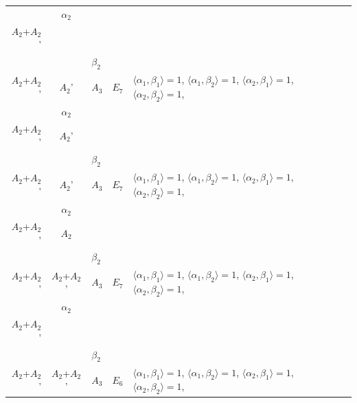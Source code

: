 \documentclass[12pt]{report}
\begin{document}
\begin{appendix}
{\begin{longtable}{rcl p{1cm}p{1cm}p{3cm} }
\\
\begin{tabular}{cc}$\alpha_1$+ & $\alpha_2$\\\tiny{ $A_2$+$A_2$' } & \tiny{  }\end{tabular} &\begin{tabular}{c} = \\~ \end{tabular} & \begin{tabular}{cc}$\beta_1$+ & $\beta_2$\\\tiny{ $A_2$+$A_2$' } & \tiny{ $A_2$' }\end{tabular} & $A_3$ & $E_7$ &  $\langle\alpha_1, \beta_1\rangle=1$, $\langle\alpha_1, \beta_2\rangle=1$, $\langle\alpha_2, \beta_1\rangle=1$, $\langle\alpha_2, \beta_2\rangle=1$, 
\\
\begin{tabular}{cc}$\alpha_1$+ & $\alpha_2$\\\tiny{ $A_2$+$A_2$' } & \tiny{ $A_2$' }\end{tabular} &\begin{tabular}{c} = \\~ \end{tabular} & \begin{tabular}{cc}$\beta_1$+ & $\beta_2$\\\tiny{ $A_2$+$A_2$' } & \tiny{ $A_2$' }\end{tabular} & $A_3$ & $E_7$ &  $\langle\alpha_1, \beta_1\rangle=1$, $\langle\alpha_1, \beta_2\rangle=1$, $\langle\alpha_2, \beta_1\rangle=1$, $\langle\alpha_2, \beta_2\rangle=1$, 
\\
\begin{tabular}{cc}$\alpha_1$+ & $\alpha_2$\\\tiny{ $A_2$+$A_2$' } & \tiny{ $A_2$ }\end{tabular} &\begin{tabular}{c} = \\~ \end{tabular} & \begin{tabular}{cc}$\beta_1$+ & $\beta_2$\\\tiny{ $A_2$+$A_2$' } & \tiny{ $A_2$+$A_2$' }\end{tabular} & $A_3$ & $E_7$ &  $\langle\alpha_1, \beta_1\rangle=1$, $\langle\alpha_1, \beta_2\rangle=1$, $\langle\alpha_2, \beta_1\rangle=1$, $\langle\alpha_2, \beta_2\rangle=1$, 
\\
\begin{tabular}{cc}$\alpha_1$+ & $\alpha_2$\\\tiny{ $A_2$+$A_2$' } & \tiny{  }\end{tabular} &\begin{tabular}{c} = \\~ \end{tabular} & \begin{tabular}{cc}$\beta_1$+ & $\beta_2$\\\tiny{ $A_2$+$A_2$' } & \tiny{ $A_2$+$A_2$' }\end{tabular} & $A_3$ & $E_6$ &  $\langle\alpha_1, \beta_1\rangle=1$, $\langle\alpha_1, \beta_2\rangle=1$, $\langle\alpha_2, \beta_1\rangle=1$, $\langle\alpha_2, \beta_2\rangle=1$, 

\end{longtable}}
\end{appendix}
\end{document}
